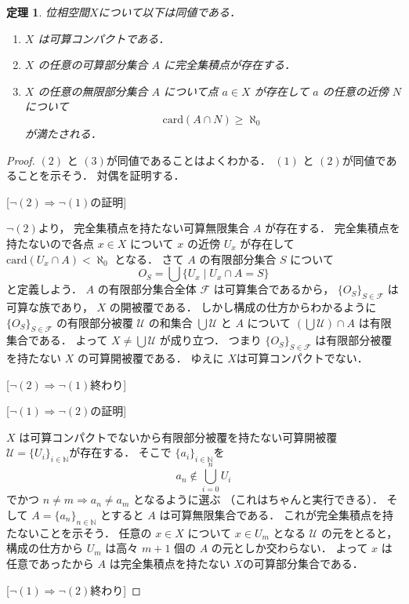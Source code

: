 \documentclass[leqno, a4paper, 12pt]{jsarticle}
\newtheorem{thm}{定理}
\newcommand{\To}{\Longrightarrow}
\newcommand{\nn}{\mathbb{N}}
\newcommand{\card}{\mathrm{card}}
\begin{document}
\begin{thm}\label{thm:ccpt}
位相空間$X$について以下は同値である．
\begin{enumerate}[label=\textup{(\arabic*)}]
\item 
$X$
は可算コンパクトである．
\item 
$X$
の任意の可算部分集合
$A$
に完全集積点が存在する．
\item 
$X$
の任意の無限部分集合
$A$
について点
$a\in X$
が存在して
$a$
の任意の近傍
$N$について
\[
\card(A\cap N)\ge \aleph_{0}
\]
が満たされる．
\end{enumerate}
\end{thm}
\begin{proof}
$(2)$
と
$(3)$が同値であることはよくわかる．
$(1)$
と
$(2)$が同値であることを示そう．
対偶を証明する．

[$\lnot (2)\To \lnot(1)$の証明]

$\lnot(2)$より，
完全集積点を持たない可算無限集合
$A$
が存在する．
完全集積点を持たないので各点
$x\in X$
について
$x$
の近傍
$U_x$
が存在して
$\card(U_x\cap A)<\aleph_{0}$
となる．
さて
$A$
の有限部分集合
$S$
について
\[
O_{S}=\bigcup\{U_x\mid U_x\cap A=S\}
\]
と定義しよう．
$A$
の有限部分集合全体
$\mathcal{F}$
は可算集合であるから，
$\{O_{S}\}_{S\in \mathcal{F}}$
は可算な族であり，
$X$
の開被覆である．
しかし構成の仕方からわかるように
$\{O_{S}\}_{S\in \mathcal{F}}$
の有限部分被覆
$\mathcal{U}$
の和集合
$\bigcup\mathcal{U}$
と
$A$
について
$(\bigcup\mathcal{U})\cap A$
は有限集合である．
よって
$X\neq \bigcup\mathcal{U}$
が成り立つ．
つまり
$\{O_{S}\}_{S\in \mathcal{F}}$
は有限部分被覆を持たない
$X$
の可算開被覆である．
ゆえに
$X$は可算コンパクトでない．


[$\lnot (2)\To \lnot(1)$終わり]



[$\lnot (1)\To \lnot (2)$の証明]

$X$
は可算コンパクトでないから有限部分被覆を持たない可算開被覆
$\mathcal{U}=\{U_i\}_{i\in \nn}$が存在する．
そこで
$\{a_i\}_{i\in \nn}$を
\[
a_n\not\in \bigcup_{i=0}^{n}U_{i}
\]
でかつ
$n\neq m\To a_n\neq a_m$
となるように選ぶ
（これはちゃんと実行できる）．
そして
$A=\{a_n\}_{n\in \nn}$
とすると
$A$
は可算無限集合である．
これが完全集積点を持たないことを示そう．
任意の
$x\in X$
について
$x\in U_m$
となる
$\mathcal{U}$
の元をとると，
構成の仕方から
$U_m$
は高々
$m+1$
個の
$A$
の元としか交わらない．
よって
$x$
は任意であったから
$A$
は完全集積点を持たない
$X$の可算部分集合である．


[$\lnot (1)\To \lnot (2)$終わり]
\end{proof}
\end{document}
